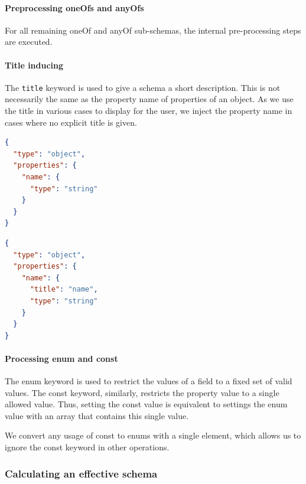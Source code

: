 \paragraph{Preprocessing oneOfs and anyOfs}
For all remaining oneOf and anyOf sub-schemas, the internal pre-processing steps are executed.


\paragraph{Title inducing}

The \texttt{title} keyword is used to give a schema a short description.
This is not necessarily the same as the property name of properties of an object.
As we use the title in various cases to display for the user, we inject the property name in cases where no explicit title is given.

\begin{lstlisting}[language=json, firstnumber=1, caption=
    {Simple JSON schema with one property without a title}, captionpos=b]
{
  "type": "object",
  "properties": {
    "name": {
      "type": "string"
    }
  }
}
\end{lstlisting}\label{listing:no-title}

\begin{lstlisting}[language=json, firstnumber=1, caption=
    {The property names was used for the title field}, captionpos=b]
{
  "type": "object",
  "properties": {
    "name": {
      "title": "name",
      "type": "string"
    }
  }
}
\end{lstlisting}\label{listing:with-title}

\paragraph{Processing enum and const}
The enum keyword is used to restrict the values of a field to a fixed set of valid values.
The const keyword, similarly, restricts the property value to a single allowed value.
Thus, setting the const value is equivalent to settings the enum value with an array that contains this single value.

We convert any usage of const to enums with a single element, which allows us to ignore the const keyword in other operations.

\subsubsection{Calculating an effective schema}

